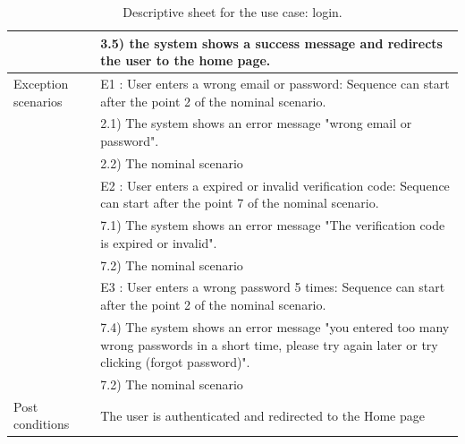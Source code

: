 \documentclass[]{uc2pfecaneva}
\begin{document}
\begin{table}[h]
\begin{tabularx}{\textwidth}{|l|X|}
            & \hspace{4mm}3.5) the system shows a success message and redirects the user to the home page.                                                                         \\ \hline
            Exception scenarios
            & E1 : User enters a wrong email or password: Sequence can start after the point 2 of the nominal scenario.                                                            \\
            & \hspace{4mm}2.1) The system shows an error message "wrong email or password".                                                                                        \\
            & \hspace{4mm}2.2) The nominal scenario                                                                                                                                \\
            & E2 : User enters a expired or invalid verification code: Sequence can start after the point 7 of the nominal scenario.                                               \\
            & \hspace{4mm}7.1) The system shows an error message "The verification code is expired or invalid".                                                                    \\
            & \hspace{4mm}7.2) The nominal scenario                                                                                                                                \\
            & E3 : User enters a wrong password 5 times: Sequence can start after the point 2 of the nominal scenario.                                                             \\
            & \hspace{4mm}7.4) The system shows an error message "you entered too many wrong passwords in a short time, please try again later or try clicking (forgot password)". \\
            & \hspace{4mm}7.2) The nominal scenario                                                                                                                                \\ \hline
            Post conditions
            & The user is authenticated and redirected to the Home page                                                                                                            \\ \hline
        \end{tabularx}
        \caption{Descriptive sheet for the use case: login.}
        \label{table:1}
    \end{table}
    \clearpage
\end{document}
